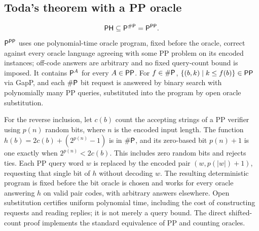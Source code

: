 \begin{result}
\subsection{Toda's theorem with a PP oracle}
\[\mathsf{PH}\subseteq\mathsf{P}^{\#\mathsf{P}}=\mathsf{P}^{\mathsf{PP}}.\]
$\mathsf{P}^{\mathsf{PP}}$ uses one polynomial-time oracle program, fixed before the oracle, correct
against every oracle language agreeing with some PP problem on its encoded instances; off-code
answers are arbitrary and no fixed query-count bound is imposed. It contains $\mathsf{P}^A$ for every $A\in\mathsf{PP}$.
For $f\in\#\mathsf{P}$, $\{(b,k)\mid k\le f(b)\}\in\mathsf{PP}$ via GapP, and each $\#\mathsf{P}$ bit request is
answered by binary search with polynomially many PP queries, substituted into the program by open
oracle substitution.

For the reverse inclusion, let $c(b)$ count the accepting strings of a PP verifier
using $p(n)$ random bits, where $n$ is the encoded input length. The function
$h(b)=2c(b)+(2^{p(n)}-1)$ is in $\#\mathsf{P}$, and its zero-based bit $p(n)+1$
is one exactly when $2^{p(n)}<2c(b)$. This includes zero random bits and rejects
ties. Each PP query word $w$ is replaced by the encoded pair
$(w,p(|w|)+1)$, requesting that single bit of $h$ without decoding $w$.
The resulting deterministic program is fixed before the bit oracle is chosen
and works for every oracle answering $h$ on valid pair codes, with arbitrary
answers elsewhere. Open substitution certifies uniform polynomial time,
including the cost of constructing requests and reading replies; it is not
merely a query bound. The direct shifted-count proof implements the standard
equivalence of PP and counting oracles.\citep{Toda1991,Fortnow1997}
\end{result}

